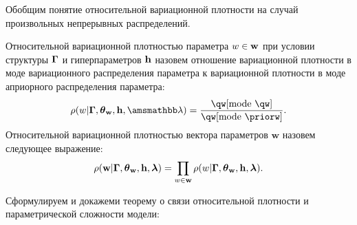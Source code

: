 Обобщим понятие относительной вариационной плотности на случай произвольных непрерывных распределений.
\begin{defin}
Относительной вариационной   плотностью параметра $w \in \mathbf{w}$  при условии структуры $\boldsymbol{\Gamma}$ и гиперпараметров $\mathbf{h}$ назовем отношение вариационной плотности в моде вариационного распределения параметра к вариационной плотности в моде априорного распределения параметра:
\[
\rho(w|\G,\tetaw, \h,\Lamb)=\frac{\qw[\text{mode}~\qw]}{\qw[\text{mode}~\priorw]}.
\]
Относительной вариационной плотностью вектора параметров $\mathbf{w}$ назовем следующее выражение:
\[
    {\rho}(\mathbf{w}|\boldsymbol{\Gamma}, \boldsymbol{\theta}_\mathbf{w}, \mathbf{h},\boldsymbol{\lambda}) = \prod_{w \in \mathbf{w}}\rho(w|\boldsymbol{\Gamma},\boldsymbol{\theta}_\mathbf{w},\mathbf{h},\boldsymbol{\lambda}).
\]

\end{defin}

Сформулируем и докажеми теорему о связи относительной плотности и параметрической сложности модели:

